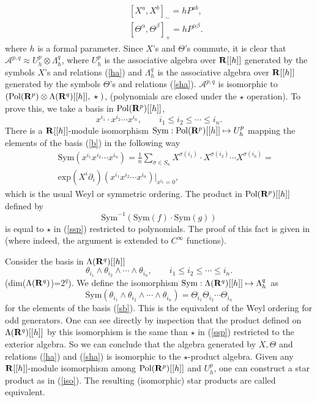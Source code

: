 \documentclass[a4paper,12pt]{article}
\begin{document}
\begin{eqnarray}
&&[X^a,X^b]_{-}=hP^{ab},     
\label{ha}\\
 &&[\Theta^\alpha,\Theta^\beta]_+=hP^{\alpha\beta}.
\label{sha}
\end{eqnarray}
where $h$ is a formal parameter.  Since $X$'s and $\Theta$'s commute, it
is clear that $\mathcal{A}^{p,q}\approx U^p_h\otimes\Lambda^q_h$, where
$U_h^p$ is the associative algebra over ${\bf R}[[h]]$ generated by the symbols
$X$'s and
relations (\ref{ha}) and  $\Lambda^q_h$ is the associative algebra over
${\bf R}[[h]]$ 
generated by the symbols $\Theta$'s and relations (\ref{sha}).
 $\mathcal{A}^{p,q}$  is isomorphic to $(\mbox{Pol}({\bf R}^p)\otimes
\Lambda({\bf R}^q)[[h]],\;\star\;)$, (polynomials are closed under the $\star$
operation). To prove this, we take a basis in $\mbox{Pol}({\bf R}^p)[[h]]$,
\begin{equation}
x^{i_1}\cdot x^{i_2}\cdots x^{i_n},\qquad i_1\leq i_2\leq\cdots \leq i_n.
\label{b}
\end{equation} 
There is a ${\bf R}[[h]]$-module isomorphism
$\mbox{Sym}:\mbox{Pol}({\bf R}^p)[[h]]\mapsto U_h^p$ mapping the elements of
the basis (\ref{b}) in the following way
\begin{eqnarray*}
&&\mbox{Sym}(x^{i_1} x^{i_2}\cdots
x^{i_n})=\frac{1}{n}\sum\limits_{\sigma\in S_n}
X^{\sigma(i_1)}\cdot X^{\sigma(i_2)}\cdots X^{\sigma(i_n)}=\\
&&\mbox{exp}({X^i\partial_i})(x^{i_1} x^{i_2}\cdots x^{i_n})|_{x^{i_k}=0},
\end{eqnarray*}
which is the usual Weyl or symmetric ordering. The  product in
$\mbox{Pol}({\bf R}^p)[[h]]$ defined by
\begin{equation}
\mbox{Sym}^{-1}(\mbox{Sym}(f)\cdot\mbox{Sym}(g))
\label{iso}
\end{equation}
is equal to  $\star$ in (\ref{ssp}) restricted to polynomials. The
proof of this fact  is given in \cite{m} (where indeed, the argument is
extended to
$C^\infty$ functions).

Consider the basis in $\Lambda({\bf R}^q)[[h]]$
\begin{equation}
\theta_{i_1}\wedge\theta_{i_2}\wedge\cdots \wedge \theta_{i_n},
\qquad i_1\leq i_2\leq\cdots \leq i_n.
\label{sb}
\end{equation}
(dim($\Lambda({\bf R}^q)$)=$2^q$).
We define the isomorphism $\mbox{Sym}:\Lambda({\bf R}^q)[[h]]\mapsto
\Lambda^q_h$ as
$$
\mbox{Sym}(\theta_{i_1}\wedge\theta_{i_2}\wedge\cdots \wedge
\theta_{i_n})=
\Theta_{i_1}\Theta_{i_2}\cdots  \Theta_{i_n}
$$
for the elements of the basis (\ref{sb}). This is the equivalent of the
Weyl ordering for odd generators. One can  see directly by inspection that
the product defined on $\Lambda({\bf R}^q)[[h]]$ by this isomorphism is the
same than $\star$ in (\ref{ssp}) restricted to the exterior algebra. So
we can conclude that the algebra generated by $X,\Theta$ and relations
(\ref{ha}) and (\ref{sha}) is isomorphic to the $\star$-product algebra.
Given
any ${\bf R}[[h]]$-module isomorphism among  $\mbox{Pol}({\bf R}^p)[[h]]$ and
$U_h^p$,
one can construct a star product as in (\ref{iso}). The resulting
(isomorphic) star products are called equivalent.
\end{document}
